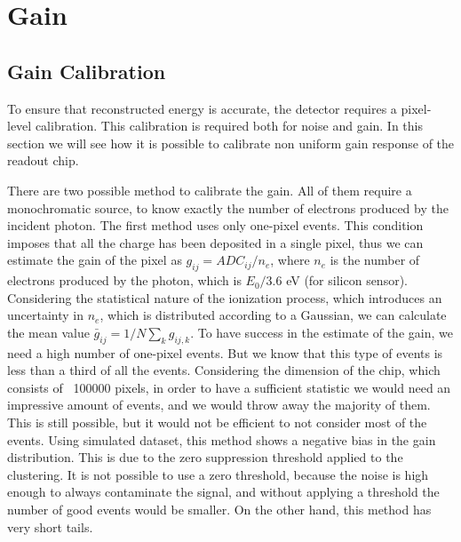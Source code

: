 \chapter{Gain}
\label{chap:gain}

\section{Gain Calibration}
To ensure that reconstructed energy is accurate, the detector requires a pixel-level calibration. This calibration is required both for noise and gain. In this section we will see how it is possible to calibrate non uniform gain response of the readout chip.

There are two possible method to calibrate the gain. All of them require a monochromatic source, to know exactly the number of electrons produced by the incident photon. The first method uses only one-pixel events. This condition imposes that all the charge has been deposited in a single pixel, thus we can estimate the gain of the pixel as $g_{ij} = ADC_{ij} / n_e$, where $n_e$ is the number of electrons produced by the photon, which is $E_0 / 3.6$ eV (for silicon sensor). Considering the statistical nature of the ionization process, which introduces an uncertainty in $n_e$, which is distributed according to a Gaussian, we can calculate the mean value $\bar{g}_{ij} = 1/N\sum_k g_{ij, k}$. To have success in the estimate of the gain, we need a high number of one-pixel events. But we know that this type of events is less than a third of all the events. Considering the dimension of the chip, which consists of ~100000 pixels, in order to have a sufficient statistic we would need an impressive amount of events, and we would throw away the majority of them. This is still possible, but it would not be efficient to not consider most of the events. Using simulated dataset, this method shows a negative bias in the gain distribution. This is due to the zero suppression threshold applied to the clustering. It is not possible to use a zero threshold, because the noise is high enough to always contaminate the signal, and without applying a threshold the number of good events would be smaller. On the other hand, this method has very short tails.

